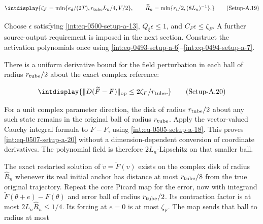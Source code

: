 \label{int:eq-setup-a-19}
\begingroup\renewcommand{\theHequation}{intdisplay.984}
\begin{equation}
\intdisplay{
\zeta_F=\min\{e_d/(2T),r_{\rm tube}L_n/4,V/2\},\qquad
\widehat R_n=\min\{r_t/2,(8L_n)^{-1}\}.
}
\tag{Setup-A.19}
\label{int:eq-0506-setup-a-19}
\end{equation}
\endgroup


Choose \(\epsilon\) satisfying \hyperref[int:eq-setup-a-13]{\eqref{int:eq-0500-setup-a-13}}, \(Q_\xi\epsilon\le1\), and \(C_F\epsilon\le\zeta_F\). A further source-output requirement is imposed in the next section. Construct the activation polynomials once using \hyperref[int:eq-setup-a-6]{\eqref{int:eq-0493-setup-a-6}}--\allowbreak \hyperref[int:eq-setup-a-7]{\eqref{int:eq-0494-setup-a-7}}.



There is a uniform derivative bound for the field perturbation in each ball of radius \(r_{\rm tube}/2\) about the exact complex reference:


\label{int:eq-setup-a-20}
\begingroup\renewcommand{\theHequation}{intdisplay.985}
\begin{equation}
\intdisplay{
\|D(\widetilde F-F)\|_{\rm op}\le2\zeta_F/r_{\rm tube}.
}
\tag{Setup-A.20}
\label{int:eq-0507-setup-a-20}
\end{equation}
\endgroup


For a unit complex parameter direction, the disk of radius \(r_{\rm tube}/2\) about any such state remains in the original ball of radius \(r_{\rm tube}\). Apply the vector-valued Cauchy integral formula to \(\widetilde F-F\), using \hyperref[int:eq-setup-a-18]{\eqref{int:eq-0505-setup-a-18}}. This proves \hyperref[int:eq-setup-a-20]{\eqref{int:eq-0507-setup-a-20}} without a dimension-dependent conversion of coordinate derivatives. The polynomial field is therefore \(2L_n\)-Lipschitz on that smaller ball.



The exact restarted solution of \(\dot v=\widetilde F(v)\) exists on the complex disk of radius \(\widehat R_n\) whenever its real initial anchor has distance at most \(r_{\rm tube}/8\) from the true original trajectory. Repeat the core Picard map for the error, now with integrand \(\widetilde F(\theta+e)-F(\theta)\) and error ball of radius \(r_{\rm tube}/2\). Its contraction factor is at most \(2L_n\widehat R_n\le1/4\). Its forcing at \(e=0\) is at most \(\zeta_F\). The map sends that ball to radius at most


